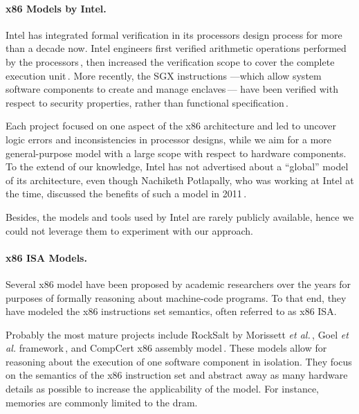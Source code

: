 \paragraph{x86 Models by Intel.}
%
Intel has integrated formal verification in its processors design process for
more than a decade now.
%
Intel engineers first verified arithmetic operations performed by the
processors\,\cite{harrison2000x86}, then increased the verification scope to
cover the complete execution unit\,\cite{kaivola2009formalintel}.
%
More recently, the SGX instructions ---which allow system software components to
create and manage enclaves\,\cite{costan2016sgxexplained}--- have been verified
with respect to security properties, rather than functional
specification\,\cite{leslie2015linsgx}.
%

Each project focused on one aspect of the x86 architecture and led to uncover
logic errors and inconsistencies in processor designs, while we aim for a more
general-purpose model with a large scope with respect to hardware components.
%
To the extend of our knowledge, Intel has not advertised about a
``global'' model of its architecture, even though Nachiketh Potlapally, who was
working at Intel at the time, discussed the benefits of such a model in
2011\,\cite{potlapally2011hardwaresecurity}.

Besides, the models and tools used by Intel are rarely publicly available, hence
we could not leverage them to experiment with our approach.
%

\paragraph{x86 ISA Models.}
%
Several x86 model have been proposed by academic researchers over
the years for purposes of formally reasoning about machine-code programs.
%
To that end, they have modeled the x86 instructions set semantics, often
referred to as x86 ISA.

Probably the most mature projects include RockSalt by Morissett \emph{et
  al.}\,\cite{morrisett2012rocksalt}, Goel \emph{et al.}
framework\,\cite{goel2014x86}, and CompCert x86 assembly
model\,\cite{leroy2012compcert}.
%
These models allow for reasoning about the execution of one software component
in isolation. They focus on the semantics of the x86 instruction set and
abstract away as many hardware details as possible to increase the applicability
of the model.
%
For instance, memories are commonly limited to the \ac{dram}.
%

